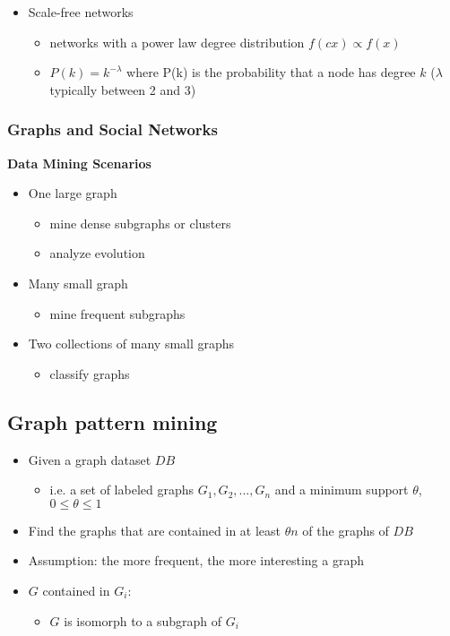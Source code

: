 \documentclass[../notes.tex]{subfiles}
\begin{document}
\begin{itemize}
  \item Scale-free networks
  \begin{itemize}
    \item networks with a power law degree distribution $f(cx) \propto f(x)$
    \item $P(k) = k^{-\lambda}$ where P(k) is the probability that a node has degree $k$ ($\lambda$ typically between 2 and 3)
  \end{itemize}
\end{itemize}

\newpage

\subsubsection{Graphs and Social Networks}
\textbf{Data Mining Scenarios}
\begin{itemize}
  \item One large graph
  \begin{itemize}
    \item mine dense subgraphs or clusters
    \item analyze evolution
  \end{itemize}

  \item Many small graph
  \begin{itemize}
    \item mine frequent subgraphs
  \end{itemize}

  \item Two collections of many small graphs
  \begin{itemize}
    \item classify graphs
  \end{itemize}

\end{itemize}

\subsection{Graph pattern mining}
\begin{itemize}
  \item Given a graph dataset $DB$
  \begin{itemize}
    \item i.e. a set of labeled graphs $G_1, G_2, ..., G_n$ and a minimum support $\theta$, $0 \le \theta \le 1$
  \end{itemize}

  \item Find the graphs that are contained in at least $\theta n$ of the graphs of $DB$
  \item Assumption: the more frequent, the more interesting a graph
  \item $G$ contained in $G_i$:
  \begin{itemize}
    \item $G$ is isomorph to a subgraph of $G_i$
  \end{itemize}
\end{itemize}
\end{document}
